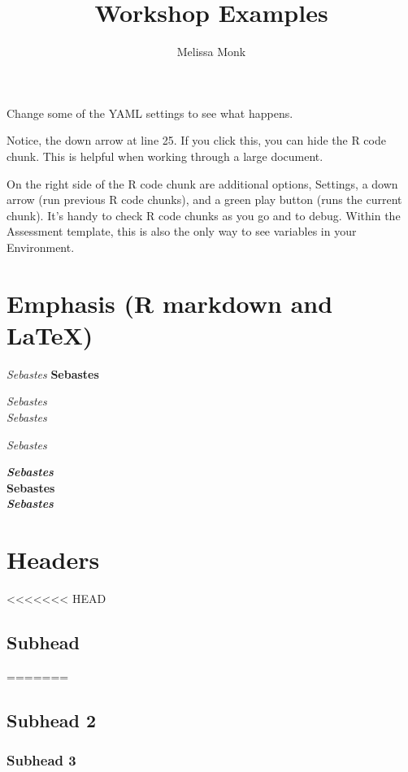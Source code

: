 \documentclass[12pt,]{article}
\title{Workshop Examples}
\author{Melissa Monk}
\date{}
\begin{document}
\maketitle

{
\setcounter{tocdepth}{4}
\tableofcontents
}
Change some of the YAML settings to see what happens.

Notice, the down arrow at line 25. If you click this, you can hide the R
code chunk. This is helpful when working through a large document.

On the right side of the R code chunk are additional options, Settings,
a down arrow (run previous R code chunks), and a green play button (runs
the current chunk). It's handy to check R code chunks as you go and to
debug. Within the Assessment template, this is also the only way to see
variables in your Environment.

\section{Emphasis (R markdown and
LaTeX)}\label{emphasis-r-markdown-and-latex}

\emph{Sebastes} \linebreak
\textbf{Sebastes}

\emph{Sebastes}\\
\emph{Sebastes}

\emph{Sebastes}

\textbf{\emph{Sebastes}}\\
\textbf{Sebastes}\\
\emph{\textbf{Sebastes}}

\section{Headers}\label{headers}

<<<<<<< HEAD
\subsection*{Subhead}\label{subhead}
=======
\subsection{Subhead 2}\label{subhead-2}

\subsubsection{Subhead 3}\label{subhead-3}
\end{document}

